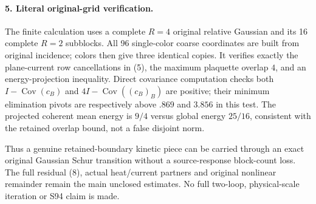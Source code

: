 \documentclass[11pt]{article}
\begin{document}
\paragraph{5. Literal original-grid verification.}
The finite calculation uses a complete $R=4$ original relative Gaussian and its 16
complete $R=2$ subblocks. All 96 single-color coarse coordinates are built
from original incidence; colors then give three identical copies.
It verifies exactly the plane-current row cancellations in (5), the
maximum plaquette overlap $4$, and an energy-projection inequality.
Direct covariance computation checks both $I-\operatorname{Cov}(c_B)$
and $4I-\operatorname{Cov}((c_B)_B)$ are positive; their minimum elimination
pivots are respectively above $.869$ and $3.856$ in this test.
The projected coherent mean energy is $9/4$ versus global energy $25/16$,
consistent with the retained overlap bound, not a false disjoint norm.

Thus a genuine retained-boundary kinetic piece can be carried through
an exact original Gaussian Schur transition without a source-response
block-count loss. The full residual (8), actual heat/current partners
and original nonlinear remainder remain the main unclosed estimates.
No full two-loop, physical-scale iteration or S94 claim is made.
\end{document}
